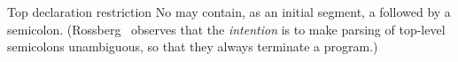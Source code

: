 \begin{clause}{Top declaration restriction}\label{clause:syntax-modules:top-declaration-restriction}
No  may contain, as an initial segment, a
 followed by a semicolon.
(Rossberg~\cite{rossberg2018defects} observes that the \emph{intention}
is to make parsing of top-level semicolons unambiguous, so that they
always terminate a program.)
\end{clause}

